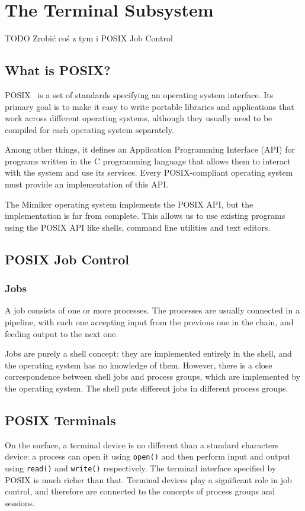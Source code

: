 \documentclass[shortabstract, manyadvisors, english, mgr]{iithesis}
\begin{document}
\chapter{The Terminal Subsystem}

TODO Zrobić coś z tym i POSIX Job Control
\section{What is POSIX?}

POSIX~\cite{posix} is a set of standards specifying an operating system
interface. Its primary goal is to make it easy to write portable libraries and
applications that work across different operating systems, although they usually
need to be compiled for each operating system separately.

Among other things, it defines an Application Programming Interface (API) for
programs written in the C programming language that allows them to interact with
the system and use its services. Every POSIX-compliant operating system must
provide an implementation of this API.

The Mimiker operating system implements the POSIX API, but the implementation is
far from complete. This allows us to use existing programs using the POSIX API
like shells, command line utilities and text editors.

\section{POSIX Job Control}

\subsection{Jobs}
A job consists of one or more processes. The processes are usually connected in
a pipeline, with each one accepting input from the previous one in the chain,
and feeding output to the next one.

Jobs are purely a shell concept: they are implemented entirely in the shell,
and the operating system has no knowledge of them. However, there is a close
correspondence between shell jobs and process groups, which are implemented by
the operating system. The shell puts different jobs in different process groups.

\section{POSIX Terminals}
On the surface, a terminal device is no different than a standard characters
device: a process can open it using \texttt{open()} and then perform input and
output using \texttt{read()} and \texttt{write()} respectively.
The terminal interface specified by POSIX is much richer than that. Terminal
devices play a significant role in job control, and therefore are connected to
the concepts of process groups and sessions.
\end{document}

